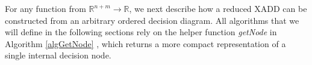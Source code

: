 \documentclass[twoside,11pt]{article}
\begin{document}
%
%
%

For any function from $\mathbb{R}^{n+m} \rightarrow \mathbb{R}$, we next
describe how a reduced XADD can be constructed from an arbitrary ordered decision diagram.
All algorithms that we will deﬁne in the following sections rely on the helper function \emph{getNode} in Algorithm \ref{algGetNode} , which returns a more compact representation of a single internal decision node. 
\end{document}
